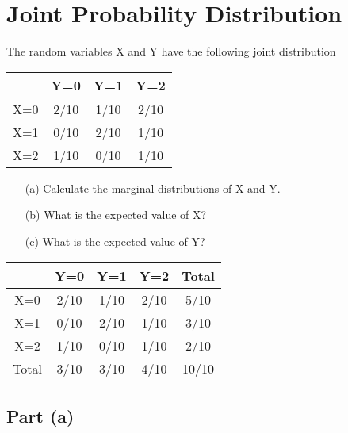 \documentclass[a4paper,12pt]{article}
\begin{document}
\large   \noindent

\section*{Joint Probability Distribution}
The random variables X and Y have the following joint distribution

\begin{center}
	\begin{tabular}{|c|c|c|c|} \hline
		\phantom{spa} \phantom{spa} & \phantom{spa} Y=0  \phantom{spa} & \phantom{spa} Y=1\phantom{spa}   & \phantom{spa} Y=2\phantom{spa} \\ \hline 
		X=0 & 2/10 & 1/10 & 2/10 \\ \hline 
		X=1 & 0/10 & 2/10 & 1/10 \\ \hline 
		X=2 & 1/10 & 0/10 & 1/10 \\ \hline 
		
	\end{tabular} 
\end{center}


\begin{itemize}
	\item[(a)] Calculate the marginal distributions of X and Y.     
	\item[(b)] What is the expected value of X?
	\item[(c)] What is the expected value of Y? 
\end{itemize} 

\medskip

\begin{center}
	\begin{tabular}{|c||c|c|c|c|}\hline
		\phantom{spa} \phantom{spa} & \phantom{spa} Y=0  \phantom{spa} & \phantom{spa} Y=1\phantom{spa}   & \phantom{spa} Y=2\phantom{spa}   & Total \\ \hline \hline 
		X=0 & 2/10 & 1/10 & 2/10& 5/10 \\ \hline 
		X=1 & 0/10 & 2/10 & 1/10 & 3/10 \\ \hline 
		X=2 & 1/10 & 0/10 & 1/10 & 2/10 \\ \hline \hline 
		Total & 3/10 & 3/10 & 4/10 & 10/10\\ \hline	
	\end{tabular} 
\end{center}

\medskip

\subsection*{Part (a)}
\end{document}
